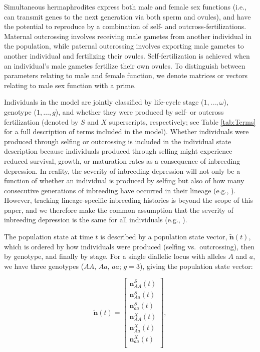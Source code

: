 \documentclass[11pt]{article}
\def\mbf#1{\mathbf{#1}}
\begin{document}
Simultaneous hermaphrodites express both male and female sex functions (i.e., can transmit genes to the next generation via both sperm and ovules), and have the potential to reproduce by a combination of self- and outcross-fertilizations. Maternal outcrossing involves receiving male gametes from another individual in the population, while paternal outcrossing involves exporting male gametes to another individual and fertilizing their ovules. Self-fertilization is achieved when an individual's male gametes fertilize their own ovules. To distinguish between parameters relating to male and female function, we denote matrices or vectors relating to male sex function with a prime. 

Individuals in the model are jointly classified by life-cycle stage ($1, \ldots, \omega$), genotype ($1, \ldots, g$), and whether they were produced by self- or outcross fertilization (denoted by $S$ and $X$ superscripts, respectively; see Table \ref{tab:Terms} for a full description of terms included in the model). Whether individuals were produced through selfing or outcrossing is included in the individual state description because individuals produced through selfing might experience reduced survival, growth, or maturation rates as a consequence of inbreeding depression. In reality, the severity of inbreeding depression will not only be a function of whether an individual is produced by selfing but also of how many consecutive generations of inbreeding have occurred in their lineage (e.g., \citealt{kelly1999response, kelly2007mutation}). However, tracking lineage-specific inbreeding histories is beyond the scope of this paper, and we therefore make the common assumption that the severity of inbreeding depression is the same for all individuals (e.g., \citealt{Charlesworth1987, Charlesworth2009, Charlesworth2010,JordanConnallon2014}).

The population state at time $t$ is described by a population state vector, $\tilde{\mbf{n}}(t)$, which is ordered by how individuals were produced (selfing vs.~outcrossing), then by genotype, and finally by stage. For a single diallelic locus with alleles $A$ and $a$, we have three genotypes ($AA,\, Aa,\, aa$; $g = 3$), giving the population state vector:
\begin{linenomath*}
\begin{equation} \label{eq:PopStateVec}
	\tilde{\mbf{n}}(t) =  \left[
								\begin{array}{c}
									\mbf{n}^{S}_{AA}(t) \\
									\mbf{n}^{S}_{Aa}(t) \\
									\mbf{n}^{S}_{aa}(t) \\ \hline
									\mbf{n}^{X}_{AA}(t) \\
									\mbf{n}^{X}_{Aa}(t) \\
									\mbf{n}^{X}_{aa}(t) \\ 
						\end{array} \right],
\end{equation}
\end{linenomath*}
\end{document}

